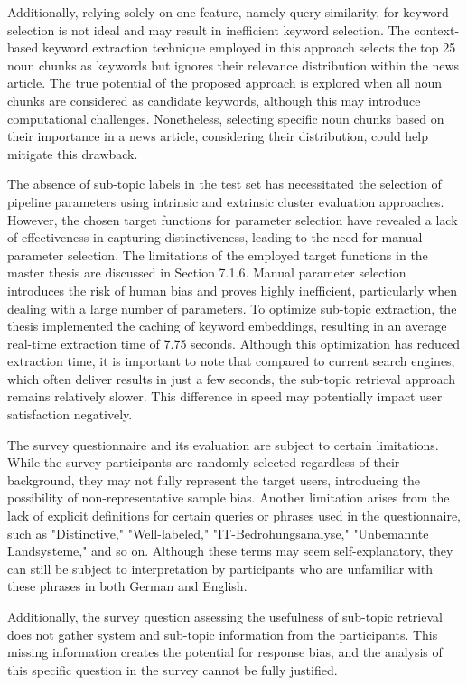 Additionally, relying solely on one feature, namely query similarity, for keyword selection is not ideal and may result in inefficient keyword selection. The context-based keyword extraction technique employed in this approach selects the top 25 noun chunks as keywords but ignores their relevance distribution within the news article. The true potential of the proposed approach is explored when all noun chunks are considered as candidate keywords, although this may introduce computational challenges. Nonetheless, selecting specific noun chunks based on their importance in a news article, considering their distribution, could help mitigate this drawback.


The absence of sub-topic labels in the test set has necessitated the selection of pipeline parameters using intrinsic and extrinsic cluster evaluation approaches. However, the chosen target functions for parameter selection have revealed a lack of effectiveness in capturing distinctiveness, leading to the need for manual parameter selection. The limitations of the employed target functions in the master thesis are discussed in Section 7.1.6. Manual parameter selection introduces the risk of human bias and proves highly inefficient, particularly when dealing with a large number of parameters. To optimize sub-topic extraction, the thesis implemented the caching of keyword embeddings, resulting in an average real-time extraction time of 7.75 seconds. Although this optimization has reduced extraction time, it is important to note that compared to current search engines, which often deliver results in just a few seconds, the sub-topic retrieval approach remains relatively slower. This difference in speed may potentially impact user satisfaction negatively.

The survey questionnaire and its evaluation are subject to certain limitations. While the survey participants are randomly selected regardless of their background, they may not fully represent the target users, introducing the possibility of non-representative sample bias. Another limitation arises from the lack of explicit definitions for certain queries or phrases used in the questionnaire, such as "Distinctive," "Well-labeled," "IT-Bedrohungsanalyse," "Unbemannte Landsysteme," and so on. Although these terms may seem self-explanatory, they can still be subject to interpretation by participants who are unfamiliar with these phrases in both German and English.

Additionally, the survey question assessing the usefulness of sub-topic retrieval does not gather system and sub-topic information from the participants. This missing information creates the potential for response bias, and the analysis of this specific question in the survey cannot be fully justified.

